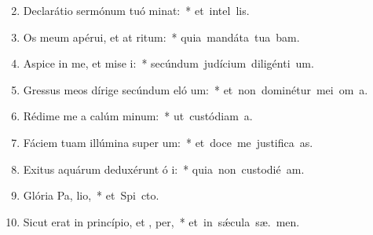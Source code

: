 \begin{flushleft}
\begin{enumerate}[leftmargin=*]
\setcounter{enumi}{1}


\item Declarátio sermónum tuó minat:~* \mbox{et intel  lis.}
\item Os meum apérui, et at ritum:~* \mbox{quia mandáta tua bam.}
\item Aspice in me, et mise i:~* \mbox{secúndum judícium diligénti  um.}
\item Gressus meos dírige secúndum eló um:~* \mbox{et non dominétur mei om a.}
\item Rédime me a calúm minum:~* \mbox{ut custódiam  a.}
\item Fáciem tuam illúmina super  um:~* \mbox{et doce me justifica as.}
\item Exitus aquárum deduxérunt ó i:~* \mbox{quia non custodié  am.}
\item Glória Pa,  lio,~* \mbox{et Spi cto.}
\item Sicut erat in princípio, et ,  per,~* \mbox{et in s\'{\ae}cula sæ. men.}



\end{enumerate}
\end{flushleft}

